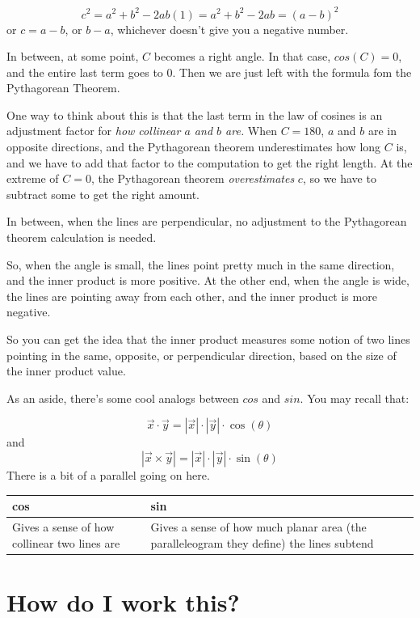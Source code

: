 \documentclass[
]{book}
\begin{document}
\[c^2 = a^2 + b^2 - 2 a b (1) = a^2 + b^2 - 2 a b = (a - b)^2\]
or \(c = a - b\), or \(b - a\), whichever doesn't give you a negative number.

In between, at some point, \(C\) becomes a right angle. In that case, \(cos(C) = 0\), and the entire last term goes to 0. Then we are just left with the formula fom the Pythagorean Theorem.

One way to think about this is that the last term in the law of cosines is an adjustment factor for \emph{how collinear \(a\) and \(b\) are.} When \(C = 180\), \(a\) and \(b\) are in opposite directions, and the Pythagorean theorem underestimates how long \(C\) is, and we have to add that factor to the computation to get the right length. At the extreme of \(C = 0\), the Pythagorean theorem \emph{overestimates} \(c\), so we have to subtract some to get the right amount.

In between, when the lines are perpendicular, no adjustment to the Pythagorean theorem calculation is needed.

So, when the angle is small, the lines point pretty much in the same direction, and the inner product is more positive. At the other end, when the angle is wide, the lines are pointing away from each other, and the inner product is more negative.

So you can get the idea that the inner product measures some notion of two lines pointing in the same, opposite, or perpendicular direction, based on the size of the inner product value.

As an aside, there's some cool analogs between \(cos\) and \(sin\). You may recall that:

\[\vec{x} \cdot \vec{y} = |\vec{x}| \cdot |\vec{y}| \cdot \cos(\theta)\]
and
\[|\vec{x} \times \vec{y}| = |\vec{x}| \cdot |\vec{y}| \cdot \sin(\theta)\]
There is a bit of a parallel going on here.

\begin{longtable}[]{@{}
  >{\raggedright\arraybackslash}p{}
  >{\raggedright\arraybackslash}p{}@{}}
\toprule
cos & sin \\
\midrule
\endhead
Gives a sense of how collinear two lines are & Gives a sense of how much planar area (the paralleleogram they define) the lines subtend \\
\bottomrule
\end{longtable}

\hypertarget{how-do-i-work-this}{%
\chapter{How do I work this?}\label{how-do-i-work-this}}
\end{document}
